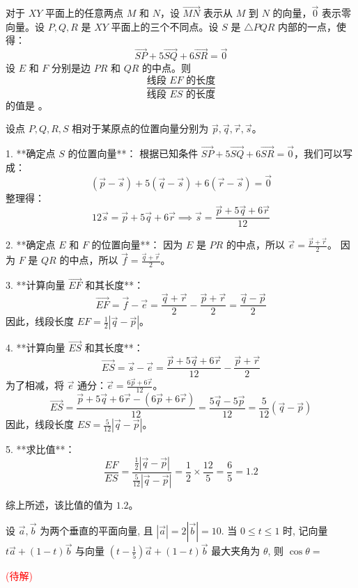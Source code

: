 \begin{questions}
    \question
对于 $XY$ 平面上的任意两点 $M$ 和 $N$，设 $\overrightarrow{MN}$ 表示从 $M$ 到 $N$ 的向量，$\vec{0}$ 表示零向量。设 $P, Q, R$ 是 $XY$ 平面上的三个不同点。设 $S$ 是 $\triangle PQR$ 内部的一点，使得：
\[ \overrightarrow{SP} + 5\overrightarrow{SQ} + 6\overrightarrow{SR} = \vec{0} \]
设 $E$ 和 $F$ 分别是边 $PR$ 和 $QR$ 的中点。则
\[ \frac{\text{线段 } EF \text{ 的长度}}{\text{线段 } ES \text{ 的长度}} \]
的值是 \underline{\hspace{2cm}}。

\begin{solution}
设点 $P, Q, R, S$ 相对于某原点的位置向量分别为 $\vec{p}, \vec{q}, \vec{r}, \vec{s}$。

1. **确定点 $S$ 的位置向量**：
   根据已知条件 $\overrightarrow{SP} + 5\overrightarrow{SQ} + 6\overrightarrow{SR} = \vec{0}$，我们可以写成：
   \[ (\vec{p} - \vec{s}) + 5(\vec{q} - \vec{s}) + 6(\vec{r} - \vec{s}) = \vec{0} \]
   整理得：
   \[ 12\vec{s} = \vec{p} + 5\vec{q} + 6\vec{r} \implies \vec{s} = \frac{\vec{p} + 5\vec{q} + 6\vec{r}}{12} \]

2. **确定点 $E$ 和 $F$ 的位置向量**：
   因为 $E$ 是 $PR$ 的中点，所以 $\vec{e} = \frac{\vec{p} + \vec{r}}{2}$。
   因为 $F$ 是 $QR$ 的中点，所以 $\vec{f} = \frac{\vec{q} + \vec{r}}{2}$。

3. **计算向量 $\overrightarrow{EF}$ 和其长度**：
   \[ \overrightarrow{EF} = \vec{f} - \vec{e} = \frac{\vec{q} + \vec{r}}{2} - \frac{\vec{p} + \vec{r}}{2} = \frac{\vec{q} - \vec{p}}{2} \]
   因此，线段长度 $EF = \frac{1}{2} |\vec{q} - \vec{p}|$。

4. **计算向量 $\overrightarrow{ES}$ 和其长度**：
   \[ \overrightarrow{ES} = \vec{s} - \vec{e} = \frac{\vec{p} + 5\vec{q} + 6\vec{r}}{12} - \frac{\vec{p} + \vec{r}}{2} \]
   为了相减，将 $\vec{e}$ 通分：$\vec{e} = \frac{6\vec{p} + 6\vec{r}}{12}$。
   \[ \overrightarrow{ES} = \frac{\vec{p} + 5\vec{q} + 6\vec{r} - (6\vec{p} + 6\vec{r})}{12} = \frac{5\vec{q} - 5\vec{p}}{12} = \frac{5}{12}(\vec{q} - \vec{p}) \]
   因此，线段长度 $ES = \frac{5}{12} |\vec{q} - \vec{p}|$。

5. **求比值**：
   \[ \frac{EF}{ES} = \frac{\frac{1}{2} |\vec{q} - \vec{p}|}{\frac{5}{12} |\vec{q} - \vec{p}|} = \frac{1}{2} \times \frac{12}{5} = \frac{6}{5} = 1.2 \]

综上所述，该比值的值为 $1.2$。
\end{solution}

    \question 设 $\vec{a},\vec{b}$ 为两个垂直的平面向量, 且 $|\vec{a}|=2|\vec{b}|=10$. 当 $0 \le t \le 1$ 时, 记向量 $t\vec{a}+(1-t)\vec{b}$ 与向量 $(t-\frac{1}{5})\vec{a}+(1-t)\vec{b}$ 最大夹角为 $\theta$, 则 $\cos\theta=$
    \begin{solution}
        \textcolor{red}{(待解)}
    \end{solution}


\end{questions}
